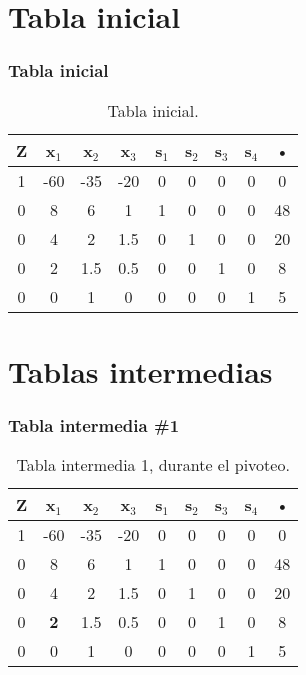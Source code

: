 \documentclass{beamer}
\begin{document}
\section{Tabla inicial} 
 
\begin{frame}  
\frametitle{Tabla inicial} 
\begin{table}[H] 
\begin{center} 
\begin{tabular}{|*{9}{c|}} 
\hline 
\textbf{Z}  & \textbf{x$_{1}$} & \textbf{x$_{2}$} & \textbf{x$_{3}$} & \textbf{s$_{1}$} & \textbf{s$_{2}$} & \textbf{s$_{3}$} & \textbf{s$_{4}$} & \textbf{•} \\\hline \hline 
1 & -60 & -35 & -20 & 0 & 0 & 0 & 0 & 0 \\\hline 
0 & 8 & 6 & 1 & 1 & 0 & 0 & 0 & 48\\ 
\hline 
0 & 4 & 2 & 1.5 & 0 & 1 & 0 & 0 & 20\\ 
\hline 
0 & 2 & 1.5 & 0.5 & 0 & 0 & 1 & 0 & 8\\ 
\hline 
0 & 0 & 1 & 0 & 0 & 0 & 0 & 1 & 5\\ 
\hline 
\end{tabular} 
\caption{Tabla inicial.} 
\end{center} 
\end{table} 
\end{frame} 
 
\section{Tablas intermedias} 
 
\begin{frame}  
\frametitle{Tabla intermedia \#1} 
\begin{table}[H] 
\begin{center} 
\begin{tabular}{|*{9}{c|}} 
\hline 
\textbf{Z}  & \cellcolor{color_columna_candidata}\textcolor{color_blanco}{\textbf{x$_{1}$}} & \textbf{x$_{2}$} & \textbf{x$_{3}$} & \textbf{s$_{1}$} & \textbf{s$_{2}$} & \textbf{s$_{3}$} & \textbf{s$_{4}$} & \textbf{•} \\\hline \hline 
1 & \cellcolor{color_columna_candidata}\textcolor{color_blanco}{-60} & -35 & -20 & 0 & 0 & 0 & 0 & 0 \\\hline 
0 & \cellcolor{color_columna_candidata}\textcolor{color_blanco}{8} & 6 & 1 & 1 & 0 & 0 & 0 & 48\\ 
\hline 
0 & \cellcolor{color_columna_candidata}\textcolor{color_blanco}{4} & 2 & 1.5 & 0 & 1 & 0 & 0 & 20\\ 
\hline 
0 & \cellcolor{color_pivote}\textbf{2} & 1.5 & 0.5 & 0 & 0 & 1 & 0 & 8\\ 
\hline 
0 & \cellcolor{color_columna_candidata}\textcolor{color_blanco}{0} & 1 & 0 & 0 & 0 & 0 & 1 & 5\\ 
\hline 
\end{tabular} 
\caption{Tabla intermedia 1, durante el pivoteo.} 
\end{center} 
\end{table} 
\end{frame} 
 
\end{document}
